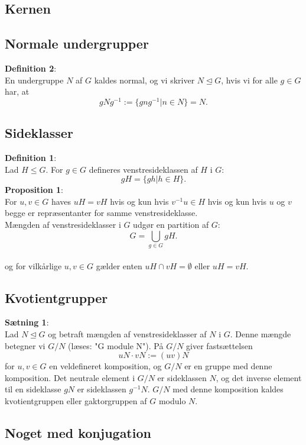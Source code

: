 \documentclass[11pt]{article}
\begin{document}
\subsection*{Kernen}

\subsection*{Normale undergrupper}
\textbf{Definition 2}:\\
En undergruppe $N$ af $G$ kaldes normal, og vi skriver $N \trianglelefteq G$, hvis vi for alle $g \in G$ har, at\\
$$gNg^{-1} := \{ gng^{-1} | n \in N \} = N.$$
\subsection*{Sideklasser}
\textbf{Definition 1}:\\
Lad $H \leq G$. For $g \in G$ defineres venstresideklassen af $H$ i $G$:\\
$$gH = \{ gh | h \in H \}.$$
\textbf{Proposition 1}:\\
For $u, v \in G$ haves $uH = vH$ hvis og kun hvis $v^{-1} u \in H$ hvis og kun hvis $u$ og $v$ begge er repræsentanter for samme venstresideklasse.\\
Mængden af venstresideklasser i $G$ udgør en partition af $G$:\\
$$G = \bigcup_{g \in G} gH.$$\\
og for vilkårlige $u, v \in G$ gælder enten $uH \cap vH = \emptyset$ eller $uH = vH$.
\subsection*{Kvotientgrupper}
\textbf{Sætning 1}:\\
Lad $N \trianglelefteq G$ og betraft mængden af venstresideklasser af $N$ i $G$. Denne mængde betegner vi $G / N$ (læses: "G module N"). På $G / N$ giver fastsættelsen
$$uN \cdot vN := (uv)N$$
for $u, v \in G$ en veldefineret komposition, og $G / N$ er en gruppe med denne komposition. Det neutrale element i $G / N$ er sideklassen $N$, og det inverse element til en sideklasse $gN$ er sideklassen $g^{-1} N$. $G / N$ med denne komposition kaldes kvotientgruppen eller gaktorgruppen af $G$ modulo $N$.\\

\subsection*{Noget med konjugation}
\end{document}
